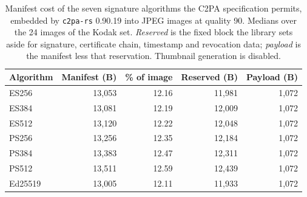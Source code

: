 \begin{table}[t]
\caption{Manifest cost of the seven signature algorithms the C2PA specification permits, embedded by \texttt{c2pa-rs} 0.90.19 into JPEG images at quality 90. Medians over the 24 images of the Kodak set. \emph{Reserved} is the fixed block the library sets aside for signature, certificate chain, timestamp and revocation data; \emph{payload} is the manifest less that reservation. Thumbnail generation is disabled.}
\label{tab:baseline}
\begin{tabular}{lrrrr}
\toprule
Algorithm & Manifest (B) & \% of image & Reserved (B) & Payload (B)\\
\midrule
ES256 & 13,053 & 12.16 & 11,981 & 1,072\\
ES384 & 13,081 & 12.19 & 12,009 & 1,072\\
ES512 & 13,120 & 12.22 & 12,048 & 1,072\\
PS256 & 13,256 & 12.35 & 12,184 & 1,072\\
PS384 & 13,383 & 12.47 & 12,311 & 1,072\\
PS512 & 13,511 & 12.59 & 12,439 & 1,072\\
Ed25519 & 13,005 & 12.11 & 11,933 & 1,072\\
\bottomrule
\end{tabular}
\end{table}
